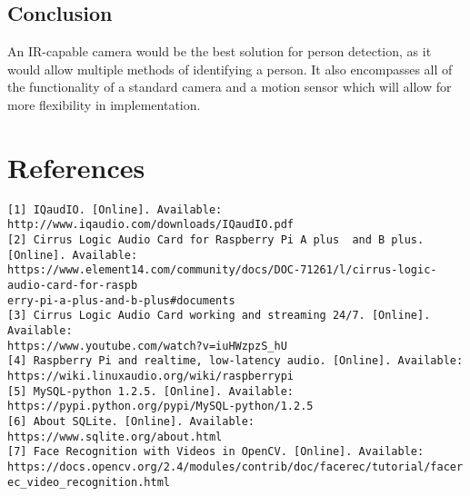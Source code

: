 \documentclass[onecolumn, draftclsnofoot,10pt, compsoc]{IEEEtran}
\begin{document}
\subsection{Conclusion}
An IR-capable camera would be the best solution for person detection, as it would allow multiple methods of identifying a person. It also encompasses all of the functionality of a standard camera and a motion sensor which will allow for more flexibility in implementation.



\newpage

\section*{References}

\verb|[1] IQaudIO. [Online]. Available: http://www.iqaudio.com/downloads/IQaudIO.pdf | \\
\verb|[2] Cirrus Logic Audio Card for Raspberry Pi A plus  and B plus. [Online]. Available:| \\ \verb|https://www.element14.com/community/docs/DOC-71261/l/cirrus-logic-audio-card-for-raspb| \\ \verb|erry-pi-a-plus-and-b-plus#documents | \\ 
\verb|[3] Cirrus Logic Audio Card working and streaming 24/7. [Online]. Available:| \\ \verb|https://www.youtube.com/watch?v=iuHWzpzS_hU | \\
\verb|[4] Raspberry Pi and realtime, low-latency audio. [Online]. Available:| \\ \verb|https://wiki.linuxaudio.org/wiki/raspberrypi | \\
\verb|[5] MySQL-python 1.2.5. [Online]. Available: https://pypi.python.org/pypi/MySQL-python/1.2.5 | \\
\verb|[6] About SQLite. [Online]. Available: https://www.sqlite.org/about.html | \\
\verb|[7] Face Recognition with Videos in OpenCV. [Online]. Available:| \\ \verb|https://docs.opencv.org/2.4/modules/contrib/doc/facerec/tutorial/facerec_video_recognition.html | \\
\end{document}
